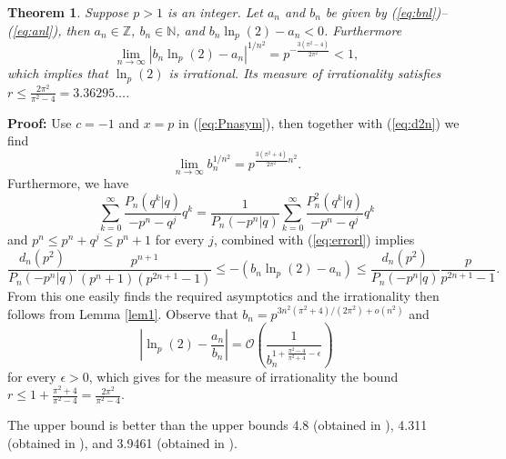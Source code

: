 \documentclass[12pt]{article}
\newtheorem{theorem}{Theorem}
\begin{document}
\begin{theorem}  \label{thm2}
Suppose $p>1$ is an integer.
Let $a_n$ and $b_n$ be given by (\ref{eq:bnl})--(\ref{eq:anl}), then
$a_n \in \mathbb{Z}$, $b_n \in \mathbb{N}$, and $b_n \ln_p(2) - a_n < 0$.
Furthermore
\[  \lim_{n \to \infty} |b_n \ln_p(2) - a_n |^{1/n^2} = p^{-\frac{3(\pi^2-4)}{2\pi^2}} < 1, \] 
which implies that $\ln_p(2)$ is irrational. Its measure of irrationality
satisfies $r \leq \frac{2\pi^2}{\pi^2-4} = 3.36295\ldots$.
\end{theorem}
\textbf{Proof:}
Use $c=-1$ and $x=p$ in (\ref{eq:Pnasym}), then together with (\ref{eq:d2n}) we find
\[  \lim_{n \to \infty} b_n^{1/n^2} = p^{\frac{3(\pi^2+4)}{2\pi^2} n^2}.  \] 
Furthermore, we have
\[   \sum_{k=0}^\infty 
   \frac{P_n(q^k|q)}{-p^n-q^j} q^k = \frac{1}{P_n(-p^n|q)}
   \sum_{k=0}^\infty 
   \frac{P_n^2(q^k|q)}{-p^n-q^j} q^k \]
and $p^n \leq p^n+q^j \leq p^n+1$ for every $j$, combined with (\ref{eq:errorl}) implies
\begin{equation*}
  \frac{d_n(p^2)}{P_n(-p^n|q)}
   \frac{p^{n+1}}{(p^n+1)(p^{2n+1}-1)} \leq
  -(b_n \ln_p(2) -a_n) 
\leq \frac{d_n(p^2)}{P_n(-p^n|q)}
    \frac{p}{p^{2n+1}-1}. 
\end{equation*}
 From this one easily finds the required asymptotics and the irrationality 
then follows from Lemma \ref{lem1}. Observe that $b_n = p^{3n^2(\pi^2+4)/(2\pi^2)+o(n^2)}$
and
\[   | \ln_p(2) - \frac{a_n}{b_n} | = \mathcal{O} \left(
   \frac{1}{b_n^{1+\frac{\pi^2-4}{\pi^2+4}-\epsilon}} \right)  \]
 for every $\epsilon > 0$, which gives for the measure of
 irrationality the bound $r \leq 1+\frac{\pi^2+4}{\pi^2-4}=\frac{2\pi^2}{\pi^2-4}$. \ \framebox{}
\bigskip

The upper bound is better than the upper bounds 4.8 (obtained in \cite{WZ}), 4.311 (obtained in \cite{BV}),
 and 3.9461 (obtained in \cite{MV}).      
   
\end{document}
